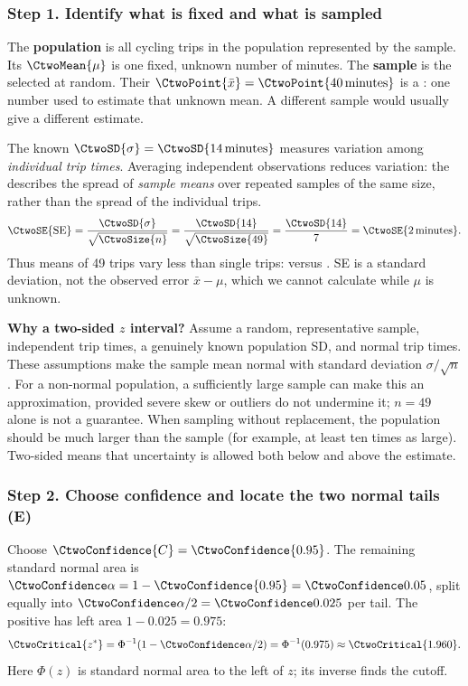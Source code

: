 \subsubsection*{Step 1. Identify what is fixed and what is sampled}
The \textbf{population} is all cycling trips in the population represented by the sample. Its  $\CtwoMean{\mu}$ is one fixed, unknown number
of minutes. The \textbf{sample} is the  selected at random.
Their  $\CtwoPoint{\bar{x}}=\CtwoPoint{40\,\text{minutes}}$
is a : one number used to estimate that unknown mean.
A different sample would usually give a different estimate.

The known 
$\CtwoSD{\sigma}=\CtwoSD{14\,\text{minutes}}$ measures variation among
\emph{individual trip times}. Averaging independent observations reduces variation:
the  describes the spread of \emph{sample means} over
repeated samples of the same size, rather than the spread of the individual trips.
\[
\CtwoSE{\mathrm{SE}}=\frac{\CtwoSD{\sigma}}{\sqrt{\CtwoSize{n}}}
=\frac{\CtwoSD{14}}{\sqrt{\CtwoSize{49}}}
=\frac{\CtwoSD{14}}{7}=\CtwoSE{2\,\text{minutes}}.
\]
Thus means of 49 trips vary less than single trips:  versus
. SE is a standard deviation, not the observed error
$\bar{x}-\mu$, which we cannot calculate while $\mu$ is unknown.

\textbf{Why a two-sided $z$ interval?} Assume a random, representative sample,
independent trip times, a genuinely known population SD, and normal trip times.
These assumptions make the sample mean normal with standard deviation
$\sigma/\sqrt n$. For a non-normal population, a sufficiently large sample can
make this an approximation, provided severe skew or outliers do not undermine it;
$n=49$ alone is not a guarantee. When sampling without replacement, the population
should be much larger than the sample (for example, at least ten times as large).
Two-sided means that uncertainty is allowed both below and above the estimate.

\subsubsection*{Step 2. Choose confidence and locate the two normal tails (E)}
Choose  $\CtwoConfidence{C}=\CtwoConfidence{0.95}$.
The remaining standard normal area is
$\CtwoSignificance{\alpha}=1-\CtwoConfidence{0.95}=\CtwoSignificance{0.05}$,
split equally into $\CtwoSignificance{\alpha}/2=\CtwoSignificance{0.025}$ per tail.
The positive  has left area $1-0.025=0.975$:
\[
\CtwoCritical{z^*}=\Phi^{-1}(1-\CtwoSignificance{\alpha}/2)
=\Phi^{-1}(0.975)\approx\CtwoCritical{1.960}.
\]
Here $\Phi(z)$ is standard normal area to the left of $z$; its inverse finds the cutoff.

